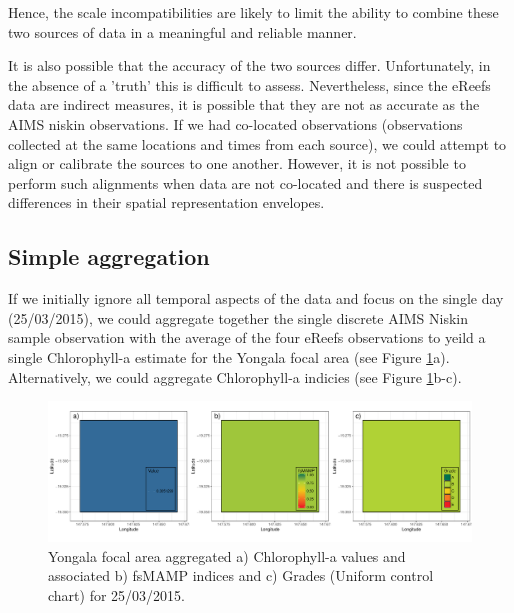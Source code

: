 Hence, the scale incompatibilities are likely to limit the ability to combine these two
sources of data in a meaningful and reliable manner.

It is also possible that the accuracy of the two sources differ.  Unfortunately, in the
absence of a 'truth' this is difficult to assess.  Nevertheless, since the eReefs data
are indirect measures, it is possible that they are not as accurate as the AIMS niskin
observations.  If we had co-located observations (observations collected at the same locations and
times from each source), we could attempt to align or calibrate the sources to one another.
However, it is not possible to perform such alignments when data are not co-located and there
is suspected differences in their spatial representation envelopes.

\subsection{Simple aggregation}

If we initially ignore all temporal aspects of the data and focus on the single day (25/03/2015),
we could aggregate together the single discrete AIMS Niskin sample observation with the average of the four
eReefs observations to yeild a single Chlorophyll-a estimate for the Yongala focal area  (see Figure \ref{fig:focalArea_Spatial.Yongala_Measure_Method1.1.chl}a).  Alternatively,
we could aggregate Chlorophyll-a indicies (see Figure \ref{fig:focalArea_Spatial.Yongala_Measure_Method1.1.chl}b-c).

\begin{figure}[!hptb]
  \includegraphics[width=\textwidth]{figures/FocalAreas/focalArea_Spatial.Yongala_Measure.chl_Method1.1.pdf}
    \caption{Yongala focal area aggregated a) Chlorophyll-a values and associated b) fsMAMP indices and c) Grades (Uniform control chart) for 25/03/2015.}\label{fig:focalArea_Spatial.Yongala_Measure_Method1.1.chl}
\end{figure}

